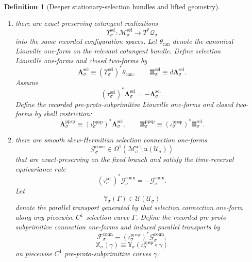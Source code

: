 \documentclass[11pt]{article}
\newcommand{\LieU}{\mathfrak u}
\newcommand{\RootClass}[1]{\mathscr U_{#1}}
\newcommand{\ConfigSpace}[1]{\mathcal Q_{#1}}
\newcommand{\PreProtoSubprimInc}[1]{\iota_{#1}^{\mathrm{ppsp}}}
\newcommand{\PreProtoSubprimLiouville}[1]{\boldsymbol{\Lambda}_{#1}^{\mathrm{ppsp}}}
\newcommand{\PreProtoSubprimTwo}[1]{\boldsymbol{\Xi}_{#1}^{\mathrm{ppsp}}}
\newcommand{\PreProtoSubprimConnectionForm}[1]{\mathcal F_{#1}^{\mathrm{conn}}}
\newcommand{\PreProtoSubprimTransport}[1]{\mathbb X_{#1}}
\newcommand{\SelSpace}[1]{\mathcal M_{#1}^{\mathrm{sel}}}
\newcommand{\SelTimeRev}[1]{\tau_{#1}^{\mathrm{sel}}}
\newcommand{\SelCotangentRealization}[1]{\Upsilon_{#1}^{\mathrm{sel}}}
\newcommand{\SelLiouville}[1]{\boldsymbol{\Lambda}_{#1}^{\mathrm{sel}}}
\newcommand{\SelTwo}[1]{\boldsymbol{\Xi}_{#1}^{\mathrm{sel}}}
\newcommand{\SelConnectionForm}[1]{\mathcal G_{#1}^{\mathrm{conn}}}
\newcommand{\SelTransport}[1]{\mathbb Y_{#1}}
\newtheorem{definition}{Definition}
\begin{document}
\begin{definition}[Deeper stationary-selection bundles and lifted geometry]
\begin{enumerate}
    \item there are exact-preserving cotangent realizations
    \[
    \SelCotangentRealization{\sigma}:\SelSpace{\sigma}\to T^*\ConfigSpace{\sigma}
    \]
    into the same recorded configuration spaces. Let \(\theta_{\mathrm{can}}\) denote the canonical Liouville one-form on the relevant cotangent bundle. Define selection Liouville one-forms and closed two-forms by
    \begin{equation}
    \SelLiouville{\sigma}\equiv (\SelCotangentRealization{\sigma})^*\theta_{\mathrm{can}},
    \qquad
    \SelTwo{\sigma}\equiv d\SelLiouville{\sigma}.
    \label{eq:selection_liouville}
    \end{equation}
    Assume
    \[
    (\SelTimeRev{\sigma})^*\SelLiouville{\sigma}
    =
    -\SelLiouville{\sigma}.
    \]
    Define the recorded pre-proto-subprimitive Liouville one-forms and closed two-forms by shell restriction:
    \begin{equation}
    \PreProtoSubprimLiouville{\sigma}\equiv (\PreProtoSubprimInc{\sigma})^*\SelLiouville{\sigma},
    \qquad
    \PreProtoSubprimTwo{\sigma}\equiv (\PreProtoSubprimInc{\sigma})^*\SelTwo{\sigma}.
    \label{eq:preproto_liouville_from_selection}
    \end{equation}
    \item there are smooth skew-Hermitian selection connection one-forms
    \[
    \SelConnectionForm{\sigma}\in \Omega^1(\SelSpace{\sigma};\LieU(\RootClass{\sigma}))
    \]
    that are exact-preserving on the fixed branch and satisfy the time-reversal equivariance rule
    \[
    (\SelTimeRev{\sigma})^*\SelConnectionForm{\sigma}
    =
    -\SelConnectionForm{\sigma}.
    \]
    Let
    \[
    \SelTransport{\sigma}(\Gamma)\in \mathcal U(\RootClass{\sigma})
    \]
    denote the parallel transport generated by that selection connection one-form along any piecewise \(C^1\) selection curve \(\Gamma\). Define the recorded pre-proto-subprimitive connection one-forms and induced parallel transports by
    \begin{equation}
    \PreProtoSubprimConnectionForm{\sigma}\equiv (\PreProtoSubprimInc{\sigma})^*\SelConnectionForm{\sigma},
    \label{eq:preproto_connection_from_selection}
    \end{equation}
    \begin{equation}
    \PreProtoSubprimTransport{\sigma}(\gamma)\equiv \SelTransport{\sigma}(\PreProtoSubprimInc{\sigma}\circ\gamma)
    \label{eq:preproto_transport_from_selection}
    \end{equation}
    on piecewise \(C^1\) pre-proto-subprimitive curves \(\gamma\).
\end{enumerate}


\end{definition}
\end{document}
